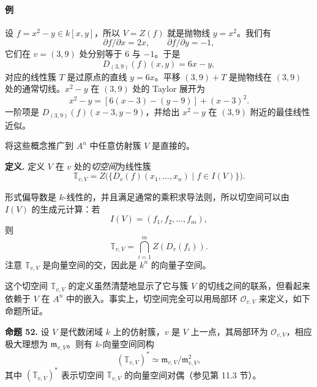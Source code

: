 \paragraph{例}
设 $f=x^2-y\in k[x,y]$，所以 $V=Z(f)$ 就是抛物线 $y=x^2$。我们有
\[
\partial f/\partial x=2x,
\qquad
\partial f/\partial y=-1,
\]
它们在 $v=(3,9)$ 处分别等于 $6$ 与 $-1$。于是
\[
D_{(3,9)}(f)(x,y)=6x-y,
\]
对应的线性簇 $T$ 是过原点的直线 $y=6x$。平移 $(3,9)+T$ 是抛物线在 $(3,9)$ 处的通常切线。$x^2-y$ 在 $(3,9)$ 处的 Taylor 展开为
\[
x^2-y=[6(x-3)-(y-9)]+(x-3)^2.
\]
一阶项是 $D_{(3,9)}(f)(x-3,y-9)$，并给出 $x^2-y$ 在 $(3,9)$ 附近的最佳线性近似。

将这些概念推广到 $A^n$ 中任意仿射簇 $V$ 是直接的。

\noindent\textbf{定义.} 定义 $V$ 在 $v$ 处的\emph{切空间}为线性簇
\[
\mathbb T_{v,V}=Z\bigl(\{D_v(f)(x_1,\ldots,x_n)\mid f\in I(V)\}\bigr).
\]

形式偏导数是 $k$-线性的，并且满足通常的乘积求导法则，所以切空间可以由 $I(V)$ 的生成元计算：若
\[
I(V)=(f_1,f_2,\ldots,f_m),
\]
则
\[
\mathbb T_{v,V}=\bigcap_{i=1}^m Z(D_v(f_i)).
\]
注意 $\mathbb T_{v,V}$ 是向量空间的交，因此是 $k^n$ 的向量子空间。

这个切空间 $\mathbb T_{v,V}$ 的定义虽然清楚地显示了它与簇 $V$ 的切线之间的联系，但看起来依赖于 $V$ 在 $A^n$ 中的嵌入。事实上，切空间完全可以用局部环 $\mathcal O_{v,V}$ 来定义，如下命题所证。

\noindent\textbf{命题 52.} 设 $V$ 是代数闭域 $k$ 上的仿射簇，$v$ 是 $V$ 上一点，其局部环为 $\mathcal O_{v,V}$，相应极大理想为 $\mathfrak m_{v,V}$。则有 $k$-向量空间同构
\[
(\mathbb T_{v,V})^*\simeq \mathfrak m_{v,V}/\mathfrak m_{v,V}^2,
\]
其中 $(\mathbb T_{v,V})^*$ 表示切空间 $\mathbb T_{v,V}$ 的向量空间对偶（参见第 11.3 节）。

